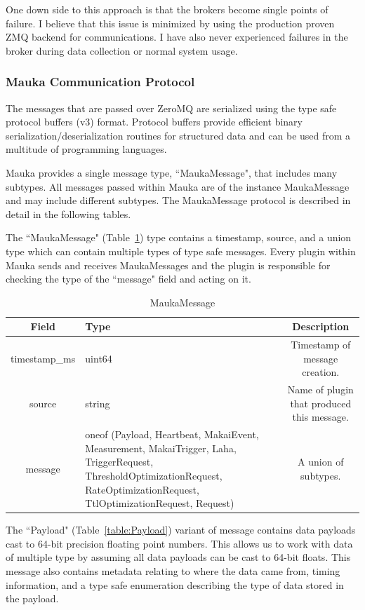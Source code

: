 One down side to this approach is that the brokers become single points of failure. I believe that this issue is minimized by using the production proven ZMQ backend for communications. I have also never experienced failures in the broker during data collection or normal system usage.

\subsubsection{Mauka Communication Protocol}
The messages that are passed over ZeroMQ are serialized using the type safe protocol buffers (v3) format. Protocol buffers provide efficient binary serialization/deserialization routines for structured data and can be used from a multitude of programming languages.

Mauka provides a single message type, ``MaukaMessage", that includes many subtypes. All messages passed within Mauka are of the instance MaukaMessage and may include different subtypes. The MaukaMessage protocol is described in detail in the following tables.

The ``MaukaMessage" (Table~\ref{table:MaukaMessage}) type contains a timestamp, source, and a union type which can contain multiple types of type safe messages. Every plugin within Mauka sends and receives MaukaMessages and the plugin is responsible for checking the type of the ``message" field and acting on it.

\begin{table}[H]
	\centering
	\caption{MaukaMessage}
	\begin{tabular}{|c|p{6cm}|c|}
		\hline
		Field & Type & Description  \\
		\hline
		timestamp\_ms & uint64 & Timestamp of message creation.  \\
		\hline
		source & string & Name of plugin that produced this message. \\
		\hline
		message & oneof (Payload, Heartbeat, MakaiEvent, Measurement, MakaiTrigger, Laha, TriggerRequest, ThresholdOptimizationRequest, RateOptimizationRequest, TtlOptimizationRequest, Request) & A union of subtypes. \\
		\hline
	\end{tabular}
	\label{table:MaukaMessage}
\end{table}

The ``Payload" (Table~\ref{table:Payload}) variant of message contains data payloads cast to 64-bit precision floating point numbers. This allows us to work with data of multiple type by assuming all data payloads can be cast to 64-bit floats. This message also contains metadata relating to where the data came from, timing information, and a type safe enumeration describing the type of data stored in the payload.

